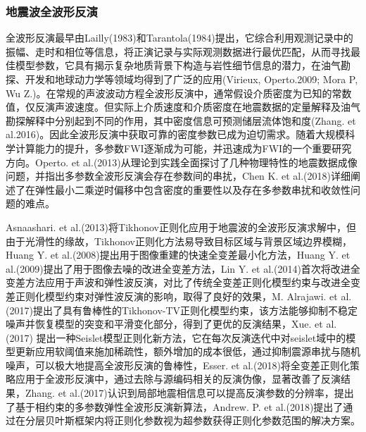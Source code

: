 \documentclass[12pt]{article}
\newcommand{\upcite}[1]{\textsuperscript{\textsuperscript{\cite{#1}}}}
\begin{document}
\subsubsection{地震波全波形反演}
全波形反演最早由Lailly(1983)和Tarantola(1984)提出\upcite{Lailly1983,Tarantola1984}，它综合利用观测记录中的振幅、走时和相位等信息，将正演记录与实际观测数据进行最优匹配，从而寻找最佳模型参数，它具有揭示复杂地质背景下构造与岩性细节信息的潜力，在油气勘探、开发和地球动力学等领域均得到了广泛的应用(Virieux, Operto.2009; Mora P, Wu Z.)\upcite{Virieux2009,Mora2018}。在常规的声波波动方程全波形反演中，通常假设介质密度为已知的常数值，仅反演声波速度。但实际上介质速度和介质密度在地震数据的定量解释及油气勘探解释中分别起到不同的作用，其中密度信息可预测储层流体饱和度(Zhang. et al.2016)\upcite{ZhangGuangzhi}。因此全波形反演中获取可靠的密度参数已成为迫切需求。随着大规模科学计算能力的提升，多参数FWI逐渐成为可能，并迅速成为FWI的一个重要研究方向。Operto. et al.(2013)从理论到实践全面探讨了几种物理特性的地震数据成像问题，并指出多参数全波形反演会存在参数间的串扰\upcite{Operto2013}，Chen K. et al.(2018)详细阐述了在弹性最小二乘逆时偏移中包含密度的重要性以及存在多参数串扰和收敛性问题的难点\upcite{Chen2018}。
\par
Asnaashari. et al.(2013)将Tikhonov正则化应用于地震波的全波形反演求解中，但由于光滑性的缘故，Tikhonov正则化方法易导致目标区域与背景区域边界模糊\upcite{Asnaashari2013}，Huang Y. et al.(2008)提出用于图像重建的快速全变差最小化方法\upcite{Huang2008}，Huang Y. et al.(2009)提出了用于图像去噪的改进全变差方法\upcite{Huang2009}，Lin Y. et al.(2014)首次将改进全变差方法应用于声波和弹性波反演\upcite{Lin2014}，对比了传统全变差正则化模型约束与改进全变差正则化模型约束对弹性波反演的影响，取得了良好的效果，M. Alrajawi. et al.(2017)提出了具有鲁棒性的Tikhonov-TV正则化模型约束，该方法能够抑制不稳定噪声并恢复模型的突变和平滑变化部分，得到了更优的反演结果\upcite{Alrajawi2007}，Xue. et al.(2017) 提出一种Seislet模型正则化新方法，它在每次反演迭代中对seislet域中的模型更新应用软阈值来施加稀疏性，额外增加的成本很低，通过抑制震源串扰与随机噪声，可以极大地提高全波形反演的鲁棒性\upcite{Xue2017}，Esser. et al.(2018)将全变差正则化策略应用于全波形反演中，通过去除与源编码相关的反演伪像，显著改善了反演结果\upcite{Esser2018}，Zhang. et al.(2017)认识到局部地震相信息可以提高反演参数的分辨率，提出了基于相约束的多参数弹性全波形反演新算法\upcite{Zhang2017}，Andrew. P. et al.(2018)提出了通过在分层贝叶斯框架内将正则化参数视为超参数获得正则化参数范围的解决方案\upcite{Andrew2018}。
\par
\end{document}
